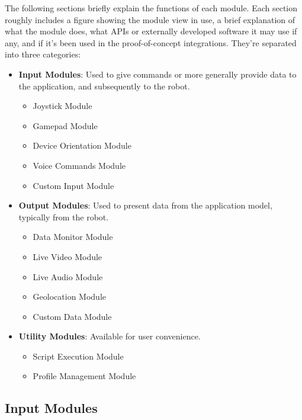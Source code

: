 The following sections briefly explain the functions of each module. Each section roughly includes a figure showing the module 
view in use, a brief explanation of what the module does, what APIs or externally developed software it may use if any, and if 
it's been used in the proof-of-concept integrations.  They're separated into three categories:
\begin{itemize}
	\item \textbf{Input Modules}: Used to give commands or more generally provide data to the application, and subsequently to 
	the robot.
		\begin{itemize}
			\item Joystick Module
			\item Gamepad Module
			\item Device Orientation Module
			\item Voice Commands Module
			\item Custom Input Module
		\end{itemize}
	\item \textbf{Output Modules}: Used to present data from the application model, typically from the robot.
		\begin{itemize}
			\item Data Monitor Module
			\item Live Video Module
			\item Live Audio Module
			\item Geolocation Module
			\item Custom Data Module
		\end{itemize}
	\item \textbf{Utility Modules}: Available for user convenience.
		\begin{itemize}
			\item Script Execution Module
			\item Profile Management Module
		\end{itemize}
\end{itemize}
\subsection{Input Modules}
